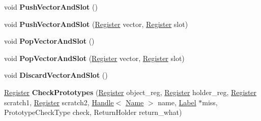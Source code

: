 \begin{DoxyCompactItemize}
\item 
void {\bfseries Push\+Vector\+And\+Slot} ()\hypertarget{classv8_1_1internal_1_1_property_handler_compiler_a4686089f9a0ce6bf8d335085b88f654d}{}\label{classv8_1_1internal_1_1_property_handler_compiler_a4686089f9a0ce6bf8d335085b88f654d}

\item 
void {\bfseries Push\+Vector\+And\+Slot} (\hyperlink{structv8_1_1internal_1_1_register}{Register} vector, \hyperlink{structv8_1_1internal_1_1_register}{Register} slot)\hypertarget{classv8_1_1internal_1_1_property_handler_compiler_a9199405584b082a1e841d476ccca8134}{}\label{classv8_1_1internal_1_1_property_handler_compiler_a9199405584b082a1e841d476ccca8134}

\item 
void {\bfseries Pop\+Vector\+And\+Slot} ()\hypertarget{classv8_1_1internal_1_1_property_handler_compiler_a5ef977ce5550fa3a9fcf9b35056575bd}{}\label{classv8_1_1internal_1_1_property_handler_compiler_a5ef977ce5550fa3a9fcf9b35056575bd}

\item 
void {\bfseries Pop\+Vector\+And\+Slot} (\hyperlink{structv8_1_1internal_1_1_register}{Register} vector, \hyperlink{structv8_1_1internal_1_1_register}{Register} slot)\hypertarget{classv8_1_1internal_1_1_property_handler_compiler_a48024abd18cd2f211f475f15dccc696f}{}\label{classv8_1_1internal_1_1_property_handler_compiler_a48024abd18cd2f211f475f15dccc696f}

\item 
void {\bfseries Discard\+Vector\+And\+Slot} ()\hypertarget{classv8_1_1internal_1_1_property_handler_compiler_aad332bb62eb811f7da80d41e77cd5eba}{}\label{classv8_1_1internal_1_1_property_handler_compiler_aad332bb62eb811f7da80d41e77cd5eba}

\item 
\hyperlink{structv8_1_1internal_1_1_register}{Register} {\bfseries Check\+Prototypes} (\hyperlink{structv8_1_1internal_1_1_register}{Register} object\+\_\+reg, \hyperlink{structv8_1_1internal_1_1_register}{Register} holder\+\_\+reg, \hyperlink{structv8_1_1internal_1_1_register}{Register} scratch1, \hyperlink{structv8_1_1internal_1_1_register}{Register} scratch2, \hyperlink{classv8_1_1internal_1_1_handle}{Handle}$<$ \hyperlink{classv8_1_1internal_1_1_name}{Name} $>$ name, \hyperlink{classv8_1_1internal_1_1_label}{Label} $\ast$miss, Prototype\+Check\+Type check, Return\+Holder return\+\_\+what)\hypertarget{classv8_1_1internal_1_1_property_handler_compiler_ad994730aabf2966d03025d978042f214}{}\label{classv8_1_1internal_1_1_property_handler_compiler_ad994730aabf2966d03025d978042f214}


\end{DoxyCompactItemize}
